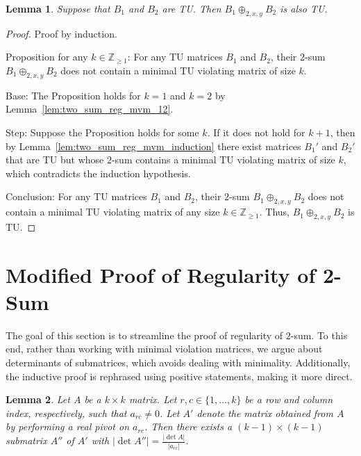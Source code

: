 \documentclass{article}
\newtheorem{lemma}{Lemma}
\theoremstyle{definition}
\begin{document}
\begin{lemma}
    Suppose that $B_{1}$ and $B_{2}$ are TU. Then $B_{1} \oplus_{2, x, y} B_{2}$ is also TU.
\end{lemma}

\begin{proof}
    Proof by induction.

    Proposition for any $k \in \mathbb{Z}_{\geq 1}$: For any TU matrices $B_{1}$ and $B_{2}$, their $2$-sum $B_{1} \oplus_{2, x, y} B_{2}$ does not contain a minimal TU violating matrix of size $k$.

    Base: The Proposition holds for $k = 1$ and $k = 2$ by Lemma~\ref{lem:two_sum_reg_mvm_12}.

    Step: Suppose the Proposition holds for some $k$. If it does not hold for $k + 1$, then by Lemma~\ref{lem:two_sum_reg_mvm_induction} there exist matrices $B_{1}'$ and $B_{2}'$ that are TU but whose $2$-sum contains a minimal TU violating matrix of size $k$, which contradicts the induction hypothesis.

    Conclusion: For any TU matrices $B_{1}$ and $B_{2}$, their $2$-sum $B_{1} \oplus_{2, x, y} B_{2}$ does not contain a minimal TU violating matrix of any size $k \in \mathbb{Z}_{\geq 1}$. Thus, $B_{1} \oplus_{2, x, y} B_{2}$ is TU.
\end{proof}


\section{Modified Proof of Regularity of 2-Sum}

The goal of this section is to streamline the proof of regularity of $2$-sum. To this end, rather than working with minimal violation matrices, we argue about determinants of submatrices, which avoids dealing with minimality. Additionally, the inductive proof is rephrased using positive statements, making it more direct.

\begin{lemma}\label{lem:pivot_smaller_det}
    Let $A$ be a $k \times k$ matrix. Let $r, c \in \{1, \dots, k\}$ be a row and column index, respectively, such that $a_{rc} \neq 0$. Let $A'$ denote the matrix obtained from $A$ by performing a real pivot on $a_{rc}$. Then there exists a $(k - 1) \times (k - 1)$ submatrix $A''$ of $A'$ with $|\det A''| = \frac{|\det A|}{|a_{rc}|}$.
\end{lemma}
\end{document}
